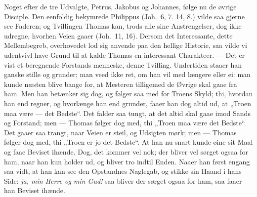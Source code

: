 \documentclass[12pt,a4paper]{book}
\begin{document}
Noget efter de tre Udvalgte, Petrus, Jakobus og Johannes, følge nu de øvrige Disciple. Den
eenfoldig bekymrede Philippus (Joh.\ 6, 7. 14, 8.) vilde saa gjerne see Faderen; og
Tvillingen Thomas kan, trods alle sine Anstrengelser, dog ikke udregne, hvorhen Veien gaaer
(Joh.\ 11, 16). Dersom det Interessante, dette Mellembegreb, overhovedet lod sig anvende
paa den hellige Historie, saa vilde vi udentvivl have Grund til at kalde Thomas en
interessant Charakteer. --- Det er vist et beregnende Forstands\-%
menneske, denne Tvilling. Undertiden staaer han ganske stille og grunder; man veed ikke
ret, om han vil med længere eller ei: man kunde næsten blive bange for, at Mesteren
tilligemed de Øvrige skal gaae fra ham. Men han betænker sig dog, og følger saa med for
Troens Skyld; thi, hvordan han end regner, og hvorlænge han end grunder, faaer han dog
altid ud, at „Troen maa være --- det Bedste“. Det falder saa tungt, at det altid skal gaae
imod Sands og Forstand; men --- Thomas følger dog med, thi „Troen maa være det Bedste“. Det
gaaer saa trangt, naar Veien er steil, og Udsigten mørk; men --- Thomas følger dog med, thi
„Troen er jo det Bedste“. At han nu snart kunde øine sit Maal og faae Beviset ihænde. Dog,
det kommer vel nok; der bliver vel sørget ogsaa for ham, naar han kun holder ud, og bliver
tro indtil Enden. Naaer han først engang saa vidt, at han kan see den Opstandnes Naglegab,
og stikke sin Haand i hans Side: \emph{ja, min Herre og min Gud!} saa bliver der sørget
ogsaa for ham, saa faaer han Beviset ihænde.
\end{document}
